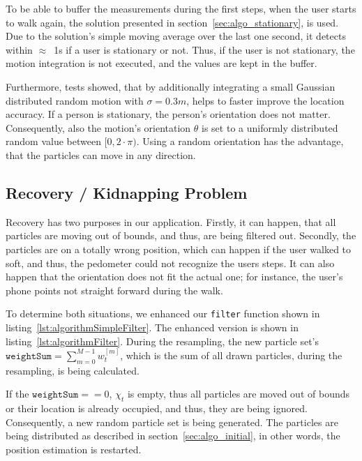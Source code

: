 To be able to buffer the measurements during the first steps, when the user starts to walk again, the solution presented in section~\ref{sec:algo_stationary}, is used. Due to the solution's simple moving average over the last one second, it detects within $\approx$~1s if a user is stationary or not. Thus, if the user is not stationary, the motion integration is not executed, and the values are kept in the buffer.

Furthermore, tests showed, that by additionally integrating a small Gaussian distributed random motion with $\sigma = 0.3m$, helps to faster improve the location accuracy. If a person is stationary, the person's orientation does not matter. Consequently, also the motion's orientation $\theta$ is set to a uniformly distributed random value between $[0, 2 \cdot \pi)$. Using a random orientation has the advantage, that the particles can move in any direction.




\subsection{Recovery / Kidnapping Problem}\label{sec:algo_recovery}
Recovery has two purposes in our application. Firstly, it can happen, that all particles are moving out of bounds, and thus, are being filtered out. Secondly, the particles are on a totally wrong position, which can happen if the user walked to soft, and thus, the pedometer could not recognize the users steps. It can also happen that the orientation does not fit the actual one; for instance, the user's phone points not straight forward during the walk.

To determine both situations, we enhanced our \texttt{filter} function shown in listing~\ref{lst:algorithmSimpleFilter}. The enhanced version is shown in listing~\ref{lst:algorithmFilter}. During the resampling, the new particle set's $\texttt{weightSum} = \sum_{m = 0}^{M-1} w^{[m]}_t$, which is the sum of all drawn particles, during the resampling, is being calculated.

If the $\texttt{weightSum} == 0$, $\chi_t$ is empty, thus all particles are moved out of bounds or their location is already occupied, and thus, they are being ignored. Consequently, a new random particle set is being generated. The particles are being distributed as described in section~\ref{sec:algo_initial}, in other words, the position estimation is restarted.

